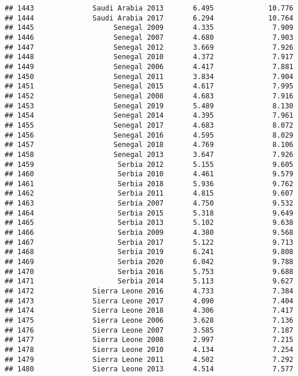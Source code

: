 \documentclass[
]{article}
\begin{document}
\begin{verbatim}
## 1443              Saudi Arabia 2013       6.495             10.776
## 1444              Saudi Arabia 2017       6.294             10.764
## 1445                   Senegal 2009       4.335              7.909
## 1446                   Senegal 2007       4.680              7.903
## 1447                   Senegal 2012       3.669              7.926
## 1448                   Senegal 2010       4.372              7.917
## 1449                   Senegal 2006       4.417              7.881
## 1450                   Senegal 2011       3.834              7.904
## 1451                   Senegal 2015       4.617              7.995
## 1452                   Senegal 2008       4.683              7.916
## 1453                   Senegal 2019       5.489              8.130
## 1454                   Senegal 2014       4.395              7.961
## 1455                   Senegal 2017       4.683              8.072
## 1456                   Senegal 2016       4.595              8.029
## 1457                   Senegal 2018       4.769              8.106
## 1458                   Senegal 2013       3.647              7.926
## 1459                    Serbia 2012       5.155              9.605
## 1460                    Serbia 2010       4.461              9.579
## 1461                    Serbia 2018       5.936              9.762
## 1462                    Serbia 2011       4.815              9.607
## 1463                    Serbia 2007       4.750              9.532
## 1464                    Serbia 2015       5.318              9.649
## 1465                    Serbia 2013       5.102              9.638
## 1466                    Serbia 2009       4.380              9.568
## 1467                    Serbia 2017       5.122              9.713
## 1468                    Serbia 2019       6.241              9.808
## 1469                    Serbia 2020       6.042              9.788
## 1470                    Serbia 2016       5.753              9.688
## 1471                    Serbia 2014       5.113              9.627
## 1472              Sierra Leone 2016       4.733              7.384
## 1473              Sierra Leone 2017       4.090              7.404
## 1474              Sierra Leone 2018       4.306              7.417
## 1475              Sierra Leone 2006       3.628              7.136
## 1476              Sierra Leone 2007       3.585              7.187
## 1477              Sierra Leone 2008       2.997              7.215
## 1478              Sierra Leone 2010       4.134              7.254
## 1479              Sierra Leone 2011       4.502              7.292
## 1480              Sierra Leone 2013       4.514              7.577

\end{verbatim}
\end{document}
